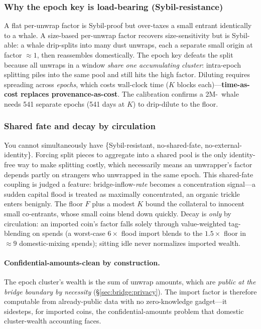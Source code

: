 \subsubsection{Why the epoch key is load-bearing (Sybil-resistance)}

A flat per-unwrap factor is Sybil-proof but over-taxes a small entrant
identically to a whale. A size-based per-unwrap factor recovers size-sensitivity
but is Sybil-able: a whale drip-splits into many dust unwraps, each a separate
small origin at factor $\approx 1$, then reassembles domestically. The epoch key
defeats the split because all unwraps in a window \emph{share one accumulating
cluster}: intra-epoch splitting piles into the same pool and still hits the high
factor. Diluting requires spreading across \emph{epochs}, which costs wall-clock
time ($K$ blocks each)---\textbf{time-as-cost replaces provenance-as-cost}. The
calibration confirms a 2M-\BTH\ whale needs 541 separate epochs (541 days at
$K$) to drip-dilute to the floor.

\subsubsection{Shared fate and decay by circulation}

You cannot simultaneously have \{Sybil-resistant, no-shared-fate,
no-external-identity\}. Forcing split pieces to aggregate into a shared pool is
the only identity-free way to make splitting costly, which necessarily means an
unwrapper's factor depends partly on strangers who unwrapped in the same epoch.
This shared-fate coupling is judged a feature: bridge-inflow-\emph{rate} becomes
a concentration signal---a sudden capital flood is treated as maximally
concentrated, an organic trickle enters benignly. The floor $F$ plus a modest
$K$ bound the collateral to innocent small co-entrants, whose small coins blend
down quickly. Decay is \emph{only} by circulation: an imported coin's factor
falls solely through value-weighted tag-blending on spends (a worst-case
$6\times$ flood import blends to the $1.5\times$ floor in $\approx 9$
domestic-mixing spends); sitting idle never normalizes imported wealth.

\paragraph{Confidential-amounts-clean by construction.} The epoch cluster's
wealth is the sum of unwrap amounts, which are \emph{public at the bridge
boundary by necessity} (\S\ref{sec:bridge:privacy}). The import factor is
therefore computable from already-public data with no zero-knowledge gadget---it
sidesteps, for imported coins, the confidential-amounts problem that domestic
cluster-wealth accounting faces.

